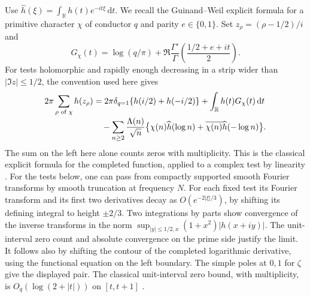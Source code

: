 \documentclass[11pt]{article}
\newcommand{\R}{\mathbb R}\newcommand{\C}{\mathbb C}\newcommand{\Z}{\mathbb Z}
\newcommand{\dd}{\,\mathrm d}
\newcommand{\wh}{\widehat}
\begin{document}
Use $\wh h(\xi)=\int_\R h(t)e^{-it\xi}\dd t$. We recall the
Guinand--Weil explicit formula for a primitive character $\chi$ of conductor
$q$ and parity $e\in\{0,1\}$. Set $z_\rho=(\rho-1/2)/i$ and
\[
 G_\chi(t)=\log(q/\pi)+\Re\frac{\Gamma'}{\Gamma}
                 \left(\frac{1/2+e+it}{2}\right).
\]
For tests holomorphic and rapidly enough decreasing in a strip wider than
$|\Im z|\le1/2$, the convention used here gives
\begin{align}
 2\pi\sum_{\rho\text{ of }\chi}h(z_\rho)
   &=2\pi\delta_{q=1}\{h(i/2)+h(-i/2)\}
      +\int_\R h(t)G_\chi(t)\dd t \notag\\[-2pt]
   &\quad -\sum_{n\ge2}\frac{\Lambda(n)}{\sqrt n}
   \big\{\chi(n)\wh h(\log n)+\overline{\chi(n)}\wh h(-\log n)\big\}.
   \label{eq:weil}
\end{align}
The sum on the left here alone counts zeros with multiplicity. This is the
classical explicit formula for the completed function, applied to a complex
test by linearity \cite{rs,dav}. For the tests below, one can pass from compactly supported smooth Fourier transforms by smooth truncation at frequency $N$. For each fixed test its Fourier transform and its first two derivatives decay as $O(e^{-2|\xi|/3})$, by shifting its defining integral to height $\pm2/3$. Two integrations by parts show convergence of the inverse transforms in the norm $\sup_{|y|\le1/2,x}(1+x^2)|h(x+iy)|$. The unit-interval zero count and absolute convergence on the prime side justify the limit. It follows also by shifting the contour of
the completed logarithmic derivative, using the functional equation on the
left boundary. The simple poles at $0,1$ for $\zeta$ give the displayed
pair. The classical unit-interval zero bound, with multiplicity, is
$O_q(\log(2+|t|))$ on $[t,t+1]$ \cite{dav}.
\end{document}
